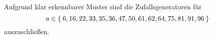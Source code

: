 \documentclass[a4paper,11pt]{article}             %
\begin{document}
\setcounter{excnt}{5}
\begin{ex}
\begin{exlist}
  \setcounter{exlisti}{2}
  \leavevmode
  \item
Aufgrund klar erkennbarer Muster sind die Zufallsgeneratoren für
\begin{equation*}
a\in\Set{6,16,22,33,35,36,47,50,61,62,64,75,81,91,96}
\end{equation*}
 auszuschließen.
\end{exlist}
\end{ex}
\end{document}

